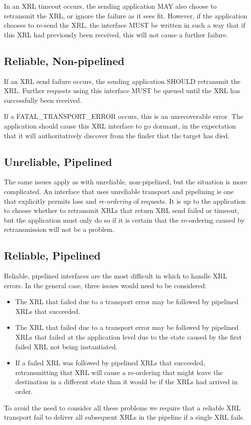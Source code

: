 \documentclass[11pt]{article}
\begin{document}
In an XRL timeout occurs, the sending application MAY also choose to
retransmit the XRL, or ignore the failure as it sees fit.  However, if
the application chooses to re-send the XRL, the interface MUST be
written in such a way that if this XRL had previously been received,
this will not cause a further failure.

\subsection*{Reliable, Non-pipelined}

If an XRL send failure occurs, the sending application SHOULD
retransmit the XRL.  Further requests using this interface
MUST be queued until the XRL has successfully been received.

If a FATAL\_TRANSPORT\_ERROR occurs, this is an unrecoverable error.
The application should cause this XRL interface to go dormant, in the
expectation that it will authoritatively discover from the finder that
the target has died.

\subsection*{Unreliable, Pipelined}

The same issues apply as with unreliable, non-pipelined, but the
situation is more complicated.  An interface that uses unreliable
transport and pipelining is one that explicitly permits loss and {\em
re-ordering} of requests.  It is up to the application to choose
whether to retransmit XRLs that return XRL send failed or timeout, but
the application must only do so if it is certain that the re-ordering
caused by retransmission will not be a problem.

\subsection*{Reliable, Pipelined}

Reliable, pipelined interfaces are the most difficult in which to
handle XRL errors.  In the general case, three issues would need to be
considered:
\begin{itemize}
\item The XRL that failed due to a transport error may be followed by
pipelined XRLs that succeeded.
\item The XRL that failed due to a transport error may be followed by
pipelined XRLs that failed at the application level due to the state
caused by the first failed XRL not being instantiated.
\item If a failed XRL was followed by pipelined XRLs that succeeded,
retransmitting that XRL will cause a re-ordering that might leave the
destination in a different state than it would be if the XRLs had
arrived in order.
\end{itemize}
To avoid the need to consider all these problems we require that a
reliable XRL transport fail to deliver all subsequent XRLs in the
pipeline if a single XRL fails.
\end{document}
